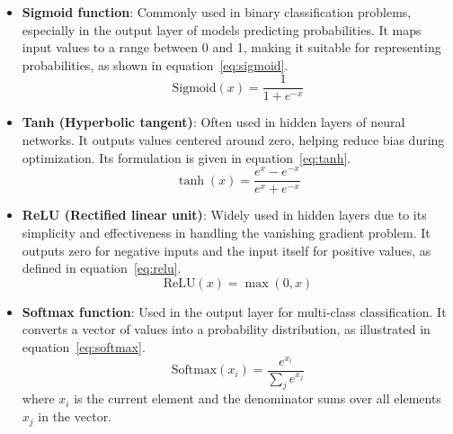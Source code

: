 \begin{itemize}
    \item \textbf{Sigmoid function}: Commonly used in binary classification problems, especially in the output layer of models predicting probabilities. It maps input values to a range between 0 and 1, making it suitable for representing probabilities, as shown in equation~\ref{eq:sigmoid}.
    \begin{equation}
        \text{Sigmoid}(x) = \frac{1}{1 + e^{-x}}
        \label{eq:sigmoid}
    \end{equation}
    
    \item \textbf{Tanh (Hyperbolic tangent)}: Often used in hidden layers of neural networks. It outputs values centered around zero, helping reduce bias during optimization. Its formulation is given in equation~\ref{eq:tanh}.
    \begin{equation}
        \tanh(x) = \frac{e^{x} - e^{-x}}{e^{x} + e^{-x}}
        \label{eq:tanh}
    \end{equation}

    \item \textbf{ReLU (Rectified linear unit)}: Widely used in hidden layers due to its simplicity and effectiveness in handling the vanishing gradient problem. It outputs zero for negative inputs and the input itself for positive values, as defined in equation~\ref{eq:relu}.
    \begin{equation}
        \text{ReLU}(x) = \max(0, x)
        \label{eq:relu}
    \end{equation}

    \item \textbf{Softmax function}: Used in the output layer for multi-class classification. It converts a vector of values into a probability distribution, as illustrated in equation~\ref{eq:softmax}.
    \begin{equation}
        \text{Softmax}(x_i) = \frac{e^{x_i}}{\sum_j e^{x_j}}
        \label{eq:softmax}
    \end{equation}
    where $x_i$ is the current element and the denominator sums over all elements $x_j$ in the vector.
\end{itemize}


